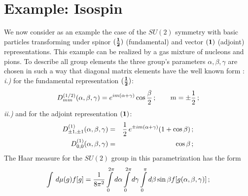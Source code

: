 \documentclass[a4paper,11pt]{article}
\begin{document}
\section{\normalsize\bf Example: Isospin}\label{isos}
\noindent
 We now consider as an example the case of the $SU(2)$ symmetry
with basic particles transforming under spinor $({\bf 1\over 2})$
(fundamental) and vector $(\bf 1)$ (adjoint) representations. This
example can be realized by a gas mixture of nucleons and pions. To
describe all group elements the three group's parameters
 $\alpha,\beta,\gamma$ are chosen in such a way that
diagonal matrix elements have the well known form \cite{Wigner}:\\
{\it i.)} for the fundamental representation $({\bf 1\over 2})$:
\begin{eqnarray}\label{j_half}
D^{(1/2)}_{mm}(\alpha,\beta,\gamma) =
e^{im(\alpha+\gamma)}\cos{\beta\over 2}\,;\qquad m=\pm{1\over
2}\,;
\end{eqnarray} {\it ii.)} and for the adjoint
representation $(\bf 1)$:\\
\begin{eqnarray}
D^{(1)}_{\pm 1,\pm 1}(\alpha,\beta,\gamma)
  &=&{1\over 2}\,e^{\pm im(\alpha+\gamma)}(1+\cos\beta)\,;\\
D^{(1)}_{0,0}(\alpha,\beta,\gamma) &=& \cos\beta\,;
\end{eqnarray}
The Haar measure for the $SU(2)$ group in this parametrization has
the form
\begin{eqnarray}
\int\,d\mu(g)f[g] ={1\over{8\pi^2}} \int\limits^{2\pi}_0d\alpha
\int\limits^{2\pi}_0d\gamma \int\limits^{\pi}_0d\beta\sin\beta
f[g(\alpha,\beta,\gamma)]\,;
\end{eqnarray}
\end{document}
